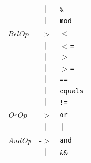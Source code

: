 \documentclass{article}
\begin{document}
\begin{center}
\begin{tabular}{lll}
 & \multicolumn{1}{c}{\textbf{$|$}} & \texttt{\%} \\
 & \multicolumn{1}{c}{\textbf{$|$}} & \texttt{mod} \\
\textit{RelOp} & -$>$ & \texttt{$<$} \\
 & \multicolumn{1}{c}{\textbf{$|$}} & \texttt{$<$=} \\
 & \multicolumn{1}{c}{\textbf{$|$}} & \texttt{$>$} \\
 & \multicolumn{1}{c}{\textbf{$|$}} & \texttt{$>$=} \\
 & \multicolumn{1}{c}{\textbf{$|$}} & \texttt{==} \\
 & \multicolumn{1}{c}{\textbf{$|$}} & \texttt{equals} \\
 & \multicolumn{1}{c}{\textbf{$|$}} & \texttt{!=} \\
\textit{OrOp} & -$>$ & \texttt{or} \\
 & \multicolumn{1}{c}{\textbf{$|$}} & \texttt{$|$$|$} \\
\textit{AndOp} & -$>$ & \texttt{and} \\
 & \multicolumn{1}{c}{\textbf{$|$}} & \texttt{\&\&} \\
\end{tabular}\end{center}

\end{document}
